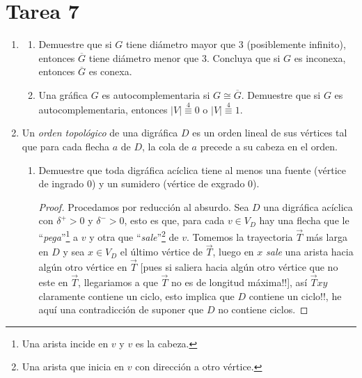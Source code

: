 \documentclass{article}
\begin{document}
\section*{\LARGE{Tarea 7}}
\begin{enumerate}
\item \begin{enumerate}
\item Demuestre que si $G$ tiene di\'ametro mayor que $3$ (posiblemente
  infinito), entonces $\overline{G}$ tiene di\'ametro menor que $3$.
  Concluya que si $G$ es inconexa, entonces $\overline{G}$ es conexa.
\item Una gr\'afica $G$ es autocomplementaria si $G \cong \overline{G}$.
  Demuestre que si $G$ es autocomplementaria, entonces $|V|
  \stackrel{4}{\equiv} 0$ o $|V| \stackrel{4}{\equiv} 1$.
\end{enumerate}
\item Un {\em orden topol\'ogico} de una digr\'afica $D$ es un orden lineal de
  sus v\'ertices tal que para cada flecha $a$ de $D$, la cola de $a$ precede a
  su cabeza en el orden.
  \begin{enumerate}
  \item Demuestre que toda digr\'afica ac\'iclica tiene al menos una fuente
    (v\'ertice de ingrado $0$) y un sumidero (v\'ertice de exgrado $0$).
    \begin{proof}
      Procedamos por reducci\'on al absurdo. Sea $D$ una digr\'afica ac\'iclica
      con $\delta^+ > 0$ y $\delta^- > 0$, esto es que, para cada $v \in V_D$ hay
      una flecha que le ``\textit{pega}''\footnote{Una arista incide en $v$ y $v$
        es la cabeza.} a $v$ y otra que ``\textit{sale}''\footnote{Una arista que
        inicia en $v$ con direcci\'on a otro v\'ertice.} de $v$. Tomemos la
      trayectoria $\vec{T}$ m\'as larga en $D$ y sea $x \in V_D$ el \'ultimo
      v\'ertice de $\vec{T}$, luego en $x$ \textit{sale} una arista hacia alg\'un
      otro v\'ertice en $\vec{T}$ [pues si saliera hacia alg\'un otro v\'ertice que
        no este en $\vec{T}$, llegariamos a que $\vec{T}$ no es de longitud m\'axima!!],
      as\'i $\vec{T}xy$ claramente contiene un ciclo, esto implica que $D$ contiene
      un ciclo!!, he aqu\'i una contradicci\'on de suponer que $D$ no contiene ciclos.
      

\end{proof}
\end{enumerate}
\end{enumerate}
\end{document}
